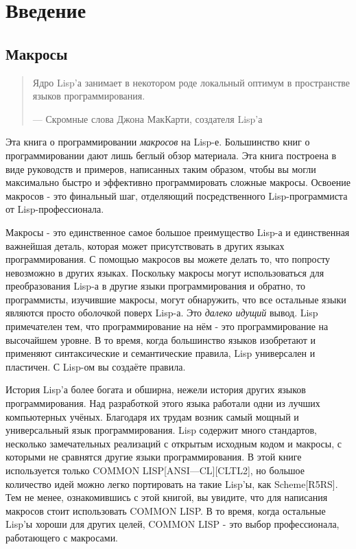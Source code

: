 \chapter{Введение}\label{chapter_introduction}
\section{Макросы}\label{section_macros}
\begin{quote}
Ядро Lisp'а занимает в некотором роде локальный оптимум в пространстве языков программирования.

— Скромные слова Джона МакКарти, создателя Lisp'а
\end{quote}
Эта книга о программировании \emph{макросов} на Lisp-е. Большинство книг о программировании дают лишь беглый обзор материала. Эта книга построена в виде руководств и примеров, написанных таким образом, чтобы вы могли максимально быстро и эффективно программировать сложные макросы. Освоение макросов - это финальный шаг, отделяющий посредственного Lisp-программиста от Lisp-профессионала.

Макросы - это единственное самое большое преимущество Lisp-а и единственная важнейшая деталь, которая может присутствовать в других языках программирования. С помощью макросов вы можете делать то, что попросту невозможно в других языках. Поскольку макросы могут использоваться для преобразования Lisp-а в другие языки программирования и обратно, то программисты, изучившие макросы, могут обнаружить, что все остальные языки являются просто оболочкой поверх Lisp-а. Это \emph{далеко идущий} вывод. Lisp примечателен тем, что программирование на нём - это программирование на высочайшем уровне. В то время, когда большинство языков изобретают и применяют синтаксические и семантические правила, Lisp универсален и пластичен. С Lisp-ом вы создаёте правила.

История Lisp'а более богата и обширна, нежели история других языков программирования. Над разработкой этого языка работали одни из лучших компьютерных учёных. Благодаря их трудам возник самый мощный и универсальный язык программирования. Lisp содержит много стандартов, несколько замечательных реализаций с открытым исходным кодом и макросы, с которыми не сравнятся другие языки программирования. В этой книге используется только COMMON LISP[ANSI—CL][CLTL2], но большое количество идей можно легко портировать на такие Lisp'ы, как Scheme[R5RS]. Тем не менее, ознакомившись с этой книгой, вы увидите, что для написания макросов стоит использовать COMMON LISP. В то время, когда остальные Lisp'ы хороши для других целей, COMMON LISP - это выбор профессионала, работающего с макросами.


